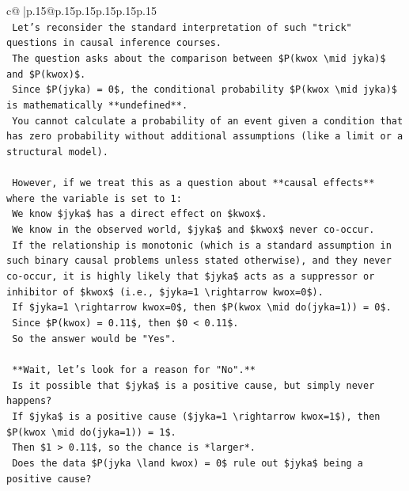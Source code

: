 \documentclass{article}
\begin{document}
{\begin{supertabular}{c@{$\;$}|p{.15\linewidth}@{}p{.15\linewidth}p{.15\linewidth}p{.15\linewidth}p{.15\linewidth}p{.15\linewidth}}
{{{\\ 
\texttt{        Let's reconsider the standard interpretation of such "trick" questions in causal inference courses.} \\
\texttt{        The question asks about the comparison between \$P(kwox \textbackslash{}mid jyka)\$ and \$P(kwox)\$.} \\
\texttt{        Since \$P(jyka) = 0\$, the conditional probability \$P(kwox \textbackslash{}mid jyka)\$ is mathematically **undefined**.} \\
\texttt{        You cannot calculate a probability of an event given a condition that has zero probability without additional assumptions (like a limit or a structural model).} \\
\\ 
\texttt{        However, if we treat this as a question about **causal effects** where the variable is set to 1:} \\
\texttt{        We know \$jyka\$ has a direct effect on \$kwox\$.} \\
\texttt{        We know in the observed world, \$jyka\$ and \$kwox\$ never co{-}occur.} \\
\texttt{        If the relationship is monotonic (which is a standard assumption in such binary causal problems unless stated otherwise), and they never co{-}occur, it is highly likely that \$jyka\$ acts as a suppressor or inhibitor of \$kwox\$ (i.e., \$jyka=1 \textbackslash{}rightarrow kwox=0\$).} \\
\texttt{        If \$jyka=1 \textbackslash{}rightarrow kwox=0\$, then \$P(kwox \textbackslash{}mid do(jyka=1)) = 0\$.} \\
\texttt{        Since \$P(kwox) = 0.11\$, then \$0 < 0.11\$.} \\
\texttt{        So the answer would be "Yes".} \\
\\ 
\texttt{        **Wait, let's look for a reason for "No".**} \\
\texttt{        Is it possible that \$jyka\$ is a positive cause, but simply never happens?} \\
\texttt{        If \$jyka\$ is a positive cause (\$jyka=1 \textbackslash{}rightarrow kwox=1\$), then \$P(kwox \textbackslash{}mid do(jyka=1)) = 1\$.} \\
\texttt{        Then \$1 > 0.11\$, so the chance is *larger*.} \\
\texttt{        Does the data \$P(jyka \textbackslash{}land kwox) = 0\$ rule out \$jyka\$ being a positive cause?} \\
}}}
\end{supertabular}}
\end{document}
